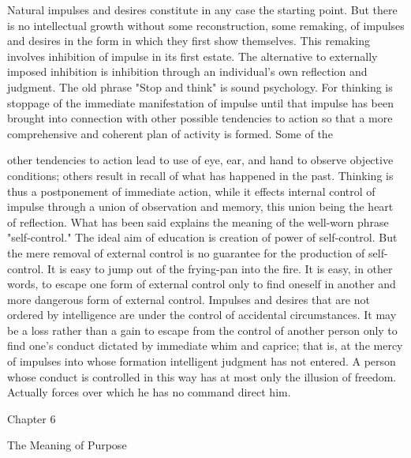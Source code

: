 Natural impulses and desires constitute in any case the starting point. But there is no 
intellectual growth without some reconstruction, some remaking, of impulses and desires 
in the form in which they first show themselves. This remaking involves inhibition of 
impulse in its first estate. The alternative to externally imposed inhibition is inhibition 
through an individual's own reflection and judgment. The old phrase "Stop and think" is 
sound psychology. For thinking is stoppage of the immediate manifestation of impulse 
until that impulse has been brought into connection with other possible tendencies to 
action so that a more comprehensive and coherent plan of activity is formed. Some of the 



other tendencies to action lead to use of eye, ear, and hand to observe objective 
conditions; others result in recall of what has happened in the past. Thinking is thus a 
postponement of immediate action, while it effects internal control of impulse through a 
union of observation and memory, this union being the heart of reflection. What has been 
said explains the meaning of the well-worn phrase "self-control." The ideal aim of 
education is creation of power of self-control. But the mere removal of external control is 
no guarantee for the production of self-control. It is easy to jump out of the frying-pan 
into the fire. It is easy, in other words, to escape one form of external control only to find 
oneself in another and more dangerous form of external control. Impulses and desires that 
are not ordered by intelligence are under the control of accidental circumstances. It may 
be a loss rather than a gain to escape from the control of another person only to find one's 
conduct dictated by immediate whim and caprice; that is, at the mercy of impulses into 
whose formation intelligent judgment has not entered. A person whose conduct is 
controlled in this way has at most only the illusion of freedom. Actually forces over 
which he has no command direct him. 


Chapter 6 

The Meaning of Purpose 


